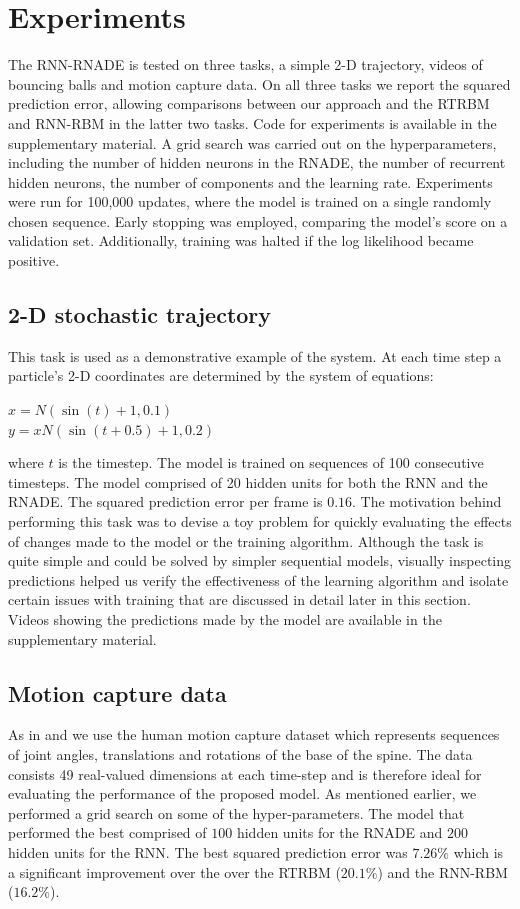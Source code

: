 \documentclass{article} %
\begin{document}
\section{Experiments}
\label{Experiments}
The RNN-RNADE is tested on three tasks, a simple 2-D trajectory, videos of bouncing balls and motion capture data. On all three tasks we report the squared prediction error, allowing comparisons between our approach and the RTRBM and RNN-RBM in the latter two tasks. Code for experiments is available in the supplementary material.  A grid search was carried out on the hyperparameters, including the number of hidden neurons in the RNADE, the number of recurrent hidden neurons, the number of components and the learning rate. Experiments were run for 100,000 updates, where the model is trained on a single randomly chosen sequence. Early stopping was employed, comparing the model's score on a validation set. Additionally, training was halted if the log likelihood became positive.


\subsection{2-D stochastic trajectory}
This task is used as a demonstrative example of the system. At each time step a particle's 2-D coordinates are determined by the system of equations:

\(x = N(\sin(t)+1,0.1)\)\\
\(y = x N(\sin(t+0.5)+1,0.2)\)

where $t$ is the timestep. The model is trained on sequences of 100 consecutive timesteps. The model comprised of 20 hidden units for both the RNN and the RNADE. The squared prediction error per frame is $\mathbf{0.16}$. The motivation behind performing this task was to devise a toy problem for quickly evaluating the effects of changes made to the model or the training algorithm. Although the task is quite simple and could be solved by simpler sequential models, visually inspecting predictions helped us verify the effectiveness of the learning algorithm and isolate certain issues with training that are discussed in detail later in this section. Videos showing the predictions made by the model are available in the supplementary material. 

\subsection{Motion capture data}
As in \cite{Sutskever2008} and \cite{Boulanger-Lewandowski2012} we use the human motion capture dataset which represents sequences of joint angles, translations and rotations of the base of the spine. The data consists 49 real-valued dimensions at each time-step and is therefore ideal for evaluating the performance of the proposed model. As mentioned earlier, we performed a grid search on some of the hyper-parameters. The model that performed the best comprised of $100$ hidden units for the RNADE and $200$ hidden units for the RNN. The best squared prediction error was $\mathbf{7.26\%}$ which is a significant improvement over the over the RTRBM ($20.1\%$) and the RNN-RBM ($16.2\%$). 
\end{document}
